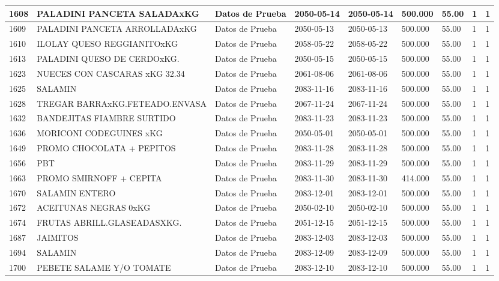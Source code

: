 \documentclass[a4paper,12pt]{article}
\begin{document}
\begin{landscape}
\begin{longtable}{|p{4cm}|p{2.5cm}|p{2.5cm}|p{1.8cm}|p{1.8cm}|p{1cm}|p{1cm}|p{3cm}|p{3cm}||}
1608 & PALADINI PANCETA SALADAxKG & Datos de Prueba & 2050-05-14 & 2050-05-14 & 500.000 & 55.00 & 1 & 1 \\ \hline 
1609 & PALADINI PANCETA ARROLLADAxKG & Datos de Prueba & 2050-05-13 & 2050-05-13 & 500.000 & 55.00 & 1 & 1 \\ \hline 
1610 & ILOLAY QUESO REGGIANITOxKG & Datos de Prueba & 2058-05-22 & 2058-05-22 & 500.000 & 55.00 & 1 & 1 \\ \hline 
1613 & PALADINI QUESO DE CERDOxKG. & Datos de Prueba & 2050-05-15 & 2050-05-15 & 500.000 & 55.00 & 1 & 1 \\ \hline 
1623 & NUECES CON CASCARAS xKG 32.34 & Datos de Prueba & 2061-08-06 & 2061-08-06 & 500.000 & 55.00 & 1 & 1 \\ \hline 
1625 & SALAMIN & Datos de Prueba & 2083-11-16 & 2083-11-16 & 500.000 & 55.00 & 1 & 1 \\ \hline 
1628 & TREGAR BARRAxKG.FETEADO.ENVASA & Datos de Prueba & 2067-11-24 & 2067-11-24 & 500.000 & 55.00 & 1 & 1 \\ \hline 
1632 & BANDEJITAS FIAMBRE SURTIDO & Datos de Prueba & 2083-11-23 & 2083-11-23 & 500.000 & 55.00 & 1 & 1 \\ \hline 
1636 & MORICONI CODEGUINES xKG & Datos de Prueba & 2050-05-01 & 2050-05-01 & 500.000 & 55.00 & 1 & 1 \\ \hline 
1649 & PROMO CHOCOLATA + PEPITOS & Datos de Prueba & 2083-11-28 & 2083-11-28 & 500.000 & 55.00 & 1 & 1 \\ \hline 
1656 & PBT & Datos de Prueba & 2083-11-29 & 2083-11-29 & 500.000 & 55.00 & 1 & 1 \\ \hline 
1663 & PROMO SMIRNOFF + CEPITA & Datos de Prueba & 2083-11-30 & 2083-11-30 & 414.000 & 55.00 & 1 & 1 \\ \hline 
1670 & SALAMIN ENTERO & Datos de Prueba & 2083-12-01 & 2083-12-01 & 500.000 & 55.00 & 1 & 1 \\ \hline 
1672 & ACEITUNAS NEGRAS 0xKG & Datos de Prueba & 2050-02-10 & 2050-02-10 & 500.000 & 55.00 & 1 & 1 \\ \hline 
1674 & FRUTAS ABRILL.GLASEADASXKG. & Datos de Prueba & 2051-12-15 & 2051-12-15 & 500.000 & 55.00 & 1 & 1 \\ \hline 
1687 & JAIMITOS & Datos de Prueba & 2083-12-03 & 2083-12-03 & 500.000 & 55.00 & 1 & 1 \\ \hline 
1694 & SALAMIN & Datos de Prueba & 2083-12-09 & 2083-12-09 & 500.000 & 55.00 & 1 & 1 \\ \hline 
1700 & PEBETE SALAME Y/O TOMATE & Datos de Prueba & 2083-12-10 & 2083-12-10 & 500.000 & 55.00 & 1 & 1 \\ \hline 

\end{longtable}
\end{landscape}
\end{document}
